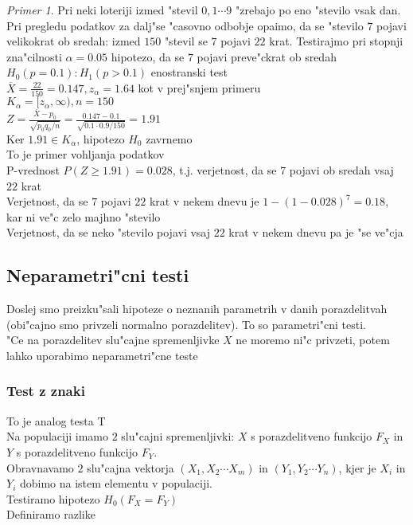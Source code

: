 \documentclass[a4paper,12pt]{article}
\theoremstyle{definition}
\theoremstyle{remark}
\newtheorem*{ex}{Primer}
\begin{document}
\begin{ex}
    Pri neki loteriji izmed "stevil $0, 1 \cdots 9$ "zrebajo po eno "stevilo vsak dan. Pri pregledu podatkov za dalj"se "casovno odbobje
    opaimo, da se "stevilo $7$ pojavi velikokrat ob sredah: izmed $150$ "stevil se $7$ pojavi $22$ krat. Testirajmo pri stopnji
    zna"cilnosti $\alpha = 0.05$ hipotezo, da se $7$ pojavi preve"ckrat ob sredah \\
    $H_0(p = 0.1) : H_1(p > 0.1)$ enostranski test \\
    $\overline{X} = \frac{22}{150} = 0.147, z_{\alpha} = 1.64$ kot v prej"snjem primeru \\


    $K_{\alpha} = [z_{\alpha}, \infty), n = 150$ \\
    $Z = \frac{\overline{X} - p_0}{\sqrt{p_0 q_0 / n}} = \frac{0.147 - 0.1}{\sqrt{0.1 \cdot 0.9 / 150}} = 1.91$ \\
    Ker $1.91 \in K_{\alpha}$, hipotezo $H_0$ zavrnemo \\
    To je primer vohljanja podatkov \\
    P-vrednost $P(Z \geq 1.91) = 0.028$, t.j. verjetnost, da se $7$ pojavi ob sredah vsaj $22$ krat \\
    Verjetnost, da se $7$ pojavi $22$ krat v nekem dnevu je $1 - (1 - 0.028)^7 = 0.18$, kar ni ve"c zelo majhno "stevilo \\
    Verjetnost, da se neko "stevilo pojavi vsaj $22$ krat v nekem dnevu pa je "se ve"cja
\end{ex}

\subsection{Neparametri"cni testi}

Doslej smo preizku"sali hipoteze o neznanih parametrih v danih porazdelitvah (obi"cajno smo privzeli normalno porazdelitev). To
so parametri"cni testi. \\
"Ce na porazdelitev slu"cajne spremenljivke $X$ ne moremo ni"c privzeti, potem lahko uporabimo neparametri"cne teste

\subsubsection{Test z znaki}

To je analog testa T \\
Na populaciji imamo $2$ slu"cajni spremenljivki: $X$ s porazdelitveno funkcijo $F_X$ in $Y$ s porazdelitveno funkcijo $F_Y$. \\
Obravnavamo $2$ slu"cajna vektorja $(X_1, X_2 \cdots X_m)$ in $(Y_1, Y_2 \cdots Y_n)$, kjer je $X_i$ in $Y_i$ dobimo na istem
elementu v populaciji. \\
Testiramo hipotezo $H_0(F_X = F_Y)$ \\
Definiramo razlike
\end{document}
